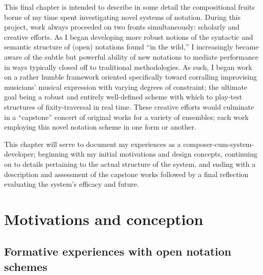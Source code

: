 
    This final chapter is intended to describe in some detail the compositional fruits borne of my time spent investigating novel systems of notation. During this project, work always proceeded on two fronts simultaneously: scholarly and creative efforts. As I began developing more robust notions of the syntactic and semantic structure of (open) notations found ``in the wild,'' I increasingly became aware of the subtle but powerful ability of new notations to mediate performance in ways typically closed off to traditional methodologies. As such, I began work on a rather humble framework oriented specifically toward corralling improvising musicians' musical expression with varying degrees of constraint; the ultimate goal being a robust and entirely well-defined scheme with which to play-test structures of fixity-traversal in real time. These creative efforts would culminate in a ``capstone'' concert of original works for a variety of ensembles; each work employing this novel notation scheme in one form or another.
    
    This chapter will serve to document my experiences as a composer-cum-system-developer; beginning with my initial motivations and design concepts, continuing on to details pertaining to the actual structure of the system, and ending with a description and assessment of the capstone works followed by a final reflection evaluating the system's efficacy and future.

\section{Motivations and conception}
    \subsection{Formative experiences with open notation schemes}

